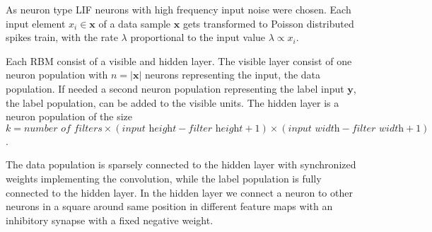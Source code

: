 As neuron type LIF neurons with high frequency input noise were chosen.
Each input element $x_i \in \textbf{x}$ of a data sample $\textbf{x}$ gets transformed to Poisson distributed spikes train, with the rate $\lambda$ proportional to the input value $\lambda \propto x_i$. 

Each RBM consist of a visible and hidden layer. 
The visible layer consist of one neuron population with $n = |\textbf{x}|$ neurons representing the input, the data population. 
If needed a second neuron population representing the label input $\textbf{y}$, the label population, can be added to the visible units.
The hidden layer is a neuron population of the size  $ k = \textit{number of filters} \times (\textit{input height} - \textit{filter height} + 1) \times (\textit{input width} - \textit{filter width} + 1)$.

The data population is sparsely connected to the hidden layer with synchronized weights implementing the convolution, while the label population is fully connected to the hidden layer.
In the hidden layer we connect a neuron to other neurons in a square around same position in different feature maps with an inhibitory synapse with a fixed negative weight.

